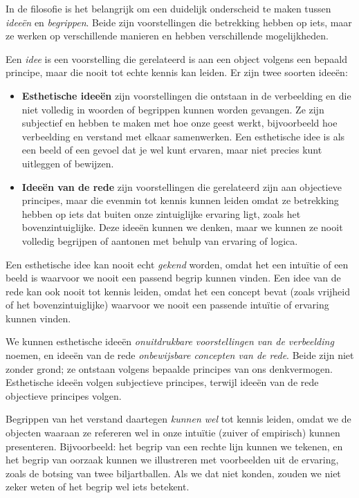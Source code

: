 \begin{mdframed}[leftmargin=0pt,rightmargin=0pt,backgroundcolor=blue!6,linecolor=white,innertopmargin=6pt,innerbottommargin=6pt]

In de filosofie is het belangrijk om een duidelijk onderscheid te maken tussen \textit{ideeën} en \textit{begrippen}. Beide zijn voorstellingen die betrekking hebben op iets, maar ze werken op verschillende manieren en hebben verschillende mogelijkheden.

Een \textit{idee} is een voorstelling die gerelateerd is aan een object volgens een bepaald principe, maar die nooit tot echte kennis kan leiden. Er zijn twee soorten ideeën:
\begin{itemize}
    \item \textbf{Esthetische ideeën} zijn voorstellingen die ontstaan in de verbeelding en die niet volledig in woorden of begrippen kunnen worden gevangen. Ze zijn subjectief en hebben te maken met hoe onze geest werkt, bijvoorbeeld hoe verbeelding en verstand met elkaar samenwerken. Een esthetische idee is als een beeld of een gevoel dat je wel kunt ervaren, maar niet precies kunt uitleggen of bewijzen.
    \item \textbf{Ideeën van de rede} zijn voorstellingen die gerelateerd zijn aan objectieve principes, maar die evenmin tot kennis kunnen leiden omdat ze betrekking hebben op iets dat buiten onze zintuiglijke ervaring ligt, zoals het bovenzintuiglijke. Deze ideeën kunnen we denken, maar we kunnen ze nooit volledig begrijpen of aantonen met behulp van ervaring of logica.
\end{itemize}

Een esthetische idee kan nooit echt \textit{gekend} worden, omdat het een intuïtie of een beeld is waarvoor we nooit een passend begrip kunnen vinden. Een idee van de rede kan ook nooit tot kennis leiden, omdat het een concept bevat (zoals vrijheid of het bovenzintuiglijke) waarvoor we nooit een passende intuïtie of ervaring kunnen vinden.

We kunnen esthetische ideeën \textit{onuitdrukbare voorstellingen van de verbeelding} noemen, en ideeën van de rede \textit{onbewijsbare concepten van de rede}. Beide zijn niet zonder grond; ze ontstaan volgens bepaalde principes van ons denkvermogen. Esthetische ideeën volgen subjectieve principes, terwijl ideeën van de rede objectieve principes volgen.

Begrippen van het verstand daartegen \textit{kunnen wel} tot kennis leiden, omdat we de objecten waaraan ze refereren wel in onze intuïtie (zuiver of empirisch) kunnen presenteren. Bijvoorbeeld: het begrip van een rechte lijn kunnen we tekenen, en het begrip van oorzaak kunnen we illustreren met voorbeelden uit de ervaring, zoals de botsing van twee biljartballen. Als we dat niet konden, zouden we niet zeker weten of het begrip wel iets betekent.


\end{mdframed}
